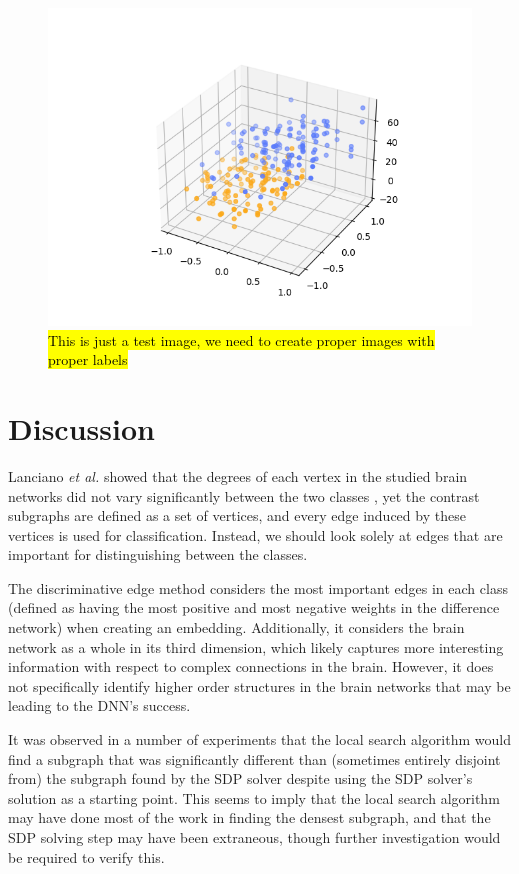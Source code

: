 \documentclass[sigconf]{acmart}
\begin{document}
\begin{figure}
    \centering
    \includegraphics[width=\columnwidth, keepaspectratio=true]{test.png}
    \caption{\hl{This is just a test image, we need to create proper images with proper labels}}
    \label{fig:my_label}
\end{figure}


\section{Discussion} \label{discussion}

Lanciano \emph{et al.} showed that the degrees of each vertex in the studied brain networks did not vary significantly between the two classes \cite{lanciano2020},
yet the contrast subgraphs are defined as a set of vertices, and every edge induced by these vertices is used for classification.
Instead, we should look solely at edges that are important for distinguishing between the classes.

The discriminative edge method considers the most important edges in each class (defined as having the most positive and most negative weights in the difference network) when creating an embedding.
Additionally, it considers the brain network as a whole in its third dimension, which likely captures more interesting information with respect to complex connections in the brain.
However, it does not specifically identify higher order structures in the brain networks that may be leading to the DNN's success.

It was observed in a number of experiments that the local search algorithm would find a subgraph that was significantly different than (sometimes entirely disjoint from) the subgraph found by the SDP solver despite using the SDP solver's solution as a starting point.
This seems to imply that the local search algorithm may have done most of the work in finding the densest subgraph, and that the SDP solving step may have been extraneous, though further investigation would be required to verify this.
\end{document}

